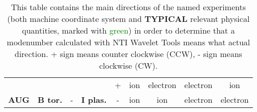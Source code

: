 \documentclass[12pt,a4paper]{article}
\begin{document}
\begin{table}[htb!]
\begin{tabular}{lllll|c|c||c|c|}
\multicolumn{1}{|l|}{}                               & \multicolumn{1}{c|}{}                                  & \multicolumn{1}{c|}{}                    & \multicolumn{1}{c|}{}                                   & \multicolumn{1}{c|}{+}          & \color{green}ion            & \color{green}electron       & \color{green}electron       & \color{green}ion            \\ \cline{5-9} 
\multicolumn{1}{|l|}{\multirow{-4}{*}{\textbf{AUG}}} & \multicolumn{1}{c|}{\multirow{-4}{*}{\textbf{B tor.}}} & \multicolumn{1}{c|}{\multirow{-2}{*}{-}} & \multicolumn{1}{c|}{\multirow{-4}{*}{\textbf{I plas.}}} & \multicolumn{1}{c|}{-} & ion                                    & ion                                    & electron                               & electron                               \\ \hline
\end{tabular}
\caption{This table contains the main directions of the named experiments (both machine coordinate system and \textbf{TYPICAL} relevant physical quantities, marked with \textcolor{green}{green}) in order to determine that a modenumber calculated with NTI Wavelet Tools means what actual direction. + sign means counter clockwise (CCW), - sign means clockwise (CW).}
\end{table}
%
\end{document}
